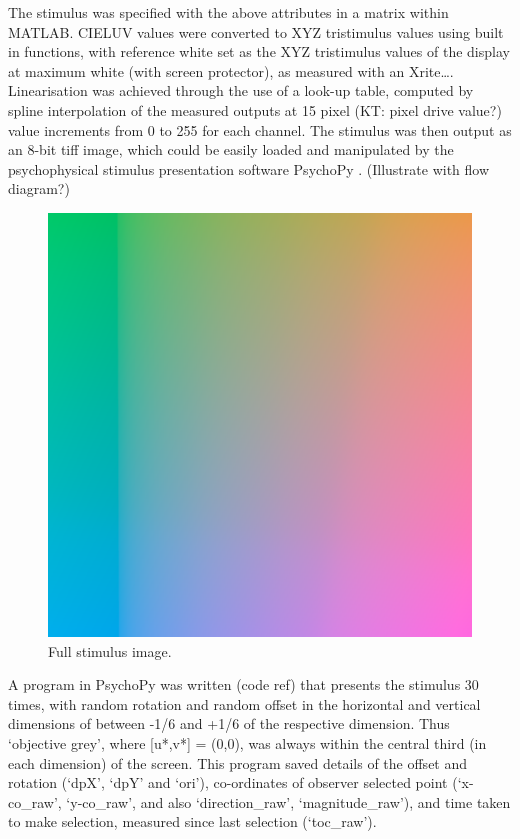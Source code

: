 The stimulus was specified with the above attributes in a matrix within MATLAB. CIELUV values were converted to XYZ tristimulus values using built in functions, with reference white set as the XYZ tristimulus values of the display at maximum white (with screen protector), as measured with an Xrite…. Linearisation was achieved through the use of a look-up table, computed by spline interpolation of the measured outputs at 15 pixel (KT: pixel drive value?) value increments from 0 to 255 for each channel. The stimulus was then output as an 8-bit tiff image, which could be easily loaded and manipulated by the psychophysical stimulus presentation software PsychoPy \citep{peirce_psychopypsychophysics_2007}. (Illustrate with flow diagram?)

\begin{figure}[hbp]
\includegraphics[width=\textwidth]{figs/tablet/stimulus.png}
\caption{Full stimulus image.}
\label{fig:Stimulus}
\end{figure}

A program in PsychoPy was written (code ref) that presents the stimulus 30 times, with random rotation and random offset in the horizontal and vertical dimensions of between -1/6 and +1/6 of the respective dimension. Thus `objective grey', where [u*,v*] = (0,0), was always within the central third (in each dimension) of the screen. This program saved details of the offset and rotation (`dpX', `dpY' and `ori'), co-ordinates of observer selected point (`x-co\_raw', `y-co\_raw', and also `direction\_raw', `magnitude\_raw'), and time taken to make selection, measured since last selection (`toc\_raw').

